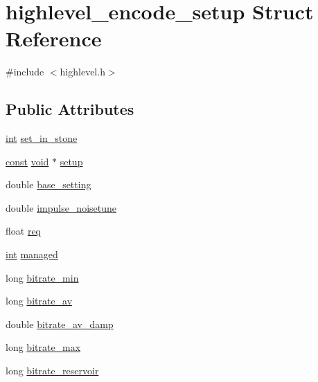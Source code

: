 \hypertarget{structhighlevel__encode__setup}{}\section{highlevel\+\_\+encode\+\_\+setup Struct Reference}
\label{structhighlevel__encode__setup}


{\ttfamily \#include $<$highlevel.\+h$>$}

\subsection*{Public Attributes}
\begin{DoxyCompactItemize}
\item 
\hyperlink{xmltok_8h_a5a0d4a5641ce434f1d23533f2b2e6653}{int} \hyperlink{structhighlevel__encode__setup_a4ed298ef54491509b77efd242ca9ef4b}{set\+\_\+in\+\_\+stone}
\item 
\hyperlink{getopt1_8c_a2c212835823e3c54a8ab6d95c652660e}{const} \hyperlink{sound_8c_ae35f5844602719cf66324f4de2a658b3}{void} $\ast$ \hyperlink{structhighlevel__encode__setup_a05e4ffe83c4f26fe5305fce8a50d0c42}{setup}
\item 
double \hyperlink{structhighlevel__encode__setup_a3bc13656a789f18e24a9d3a29e0ad2f8}{base\+\_\+setting}
\item 
double \hyperlink{structhighlevel__encode__setup_adc48ac43bf3f4c896d60e7cac2710b19}{impulse\+\_\+noisetune}
\item 
float \hyperlink{structhighlevel__encode__setup_a77cd5d92231c63d5d29d34a49a055014}{req}
\item 
\hyperlink{xmltok_8h_a5a0d4a5641ce434f1d23533f2b2e6653}{int} \hyperlink{structhighlevel__encode__setup_a232b52aae5a1dc432c2fde0859a9de30}{managed}
\item 
long \hyperlink{structhighlevel__encode__setup_a44cebbbf6e74eb249c8f3981a6538c59}{bitrate\+\_\+min}
\item 
long \hyperlink{structhighlevel__encode__setup_ac9bf8d9dc914f6f82e9ae90429c604f8}{bitrate\+\_\+av}
\item 
double \hyperlink{structhighlevel__encode__setup_a5c6509b43d015ea6d3508a305cd70f5f}{bitrate\+\_\+av\+\_\+damp}
\item 
long \hyperlink{structhighlevel__encode__setup_ac9f4259842f3184845db9e31de14343d}{bitrate\+\_\+max}
\item 
long \hyperlink{structhighlevel__encode__setup_a70c7bbeec8ca895762c0f2f5caafcb93}{bitrate\+\_\+reservoir}

\end{DoxyCompactItemize}
